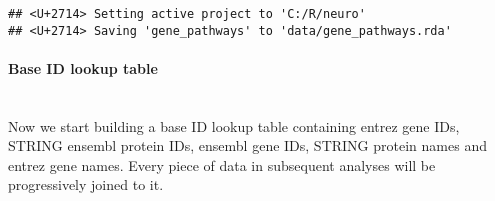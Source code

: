 \begin{verbatim}
## <U+2714> Setting active project to 'C:/R/neuro'
## <U+2714> Saving 'gene_pathways' to 'data/gene_pathways.rda'
\end{verbatim}

\begin{table}[H]
\centering
{}
\end{table}

\hypertarget{base-id-lookup-table}{%
\paragraph{Base ID lookup table}\label{base-id-lookup-table}}

\texttt{}\\
Now we start building a base ID lookup table containing entrez gene IDs,
STRING ensembl protein IDs, ensembl gene IDs, STRING protein names and
entrez gene names. Every piece of data in subsequent analyses will be
progressively joined to it.

